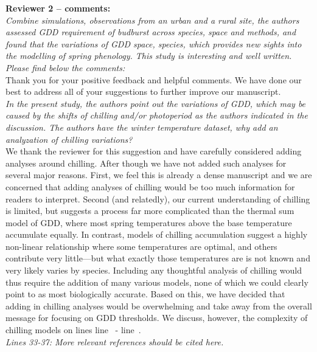 \documentclass[11pt,a4paper]{article}\usepackage[]{graphicx}\usepackage[]{color}
\newcommand{\lr}[1]{line~\lineref{#1}}
\begin{document}
\textbf {Reviewer 2 -- comments:} \\

\textit{Combine simulations, observations from an urban and a rural site, the authors assessed GDD requirement of budburst across species, space and methods, and found that the variations of GDD space, species, which provides new sights into the modelling of spring phenology. This study is interesting and well written. Please find below the comments:} \\

Thank you for your positive feedback and helpful comments. We have done our best to address all of your suggestions to further improve our manuscript. \\

\textit{In the present study, the authors point out the variations of GDD, which may be caused by the shifts of chilling and/or photoperiod as the authors indicated in the discussion. The authors have the winter temperature dataset, why add an analyzation of chilling variations?} \\

We thank the reviewer for this suggestion and have carefully considered adding analyses around chilling. After though we have not added such analyses for several major reasons. First, we feel this is already a dense manuscript and we are concerned that adding analyses of chilling would be too much information for readers to interpret. Second (and relatedly), our current understanding of chilling is limited, but suggests a process far more complicated than the thermal sum model of GDD, where most spring temperatures above the base temperature accumulate equally. In contrast, models of chilling accumulation suggest a highly non-linear relationship where some temperatures are optimal, and others contribute very little---but what exactly those temperatures are is not known and very likely varies by species. Including any thoughtful analysis of chilling would thus require the addition of many various models, none of which we could clearly point to as most biologically accurate. Based on this, we have decided that adding in chilling analyses would be overwhelming and take away from the overall message for focusing on GDD thresholds. We discuss, however, the complexity of chilling models on lines \lr{Z2chillstart} - \lr{Z2chillend}.  \\  

\textit{Lines 33-37: More relevant references should be cited here.} \\
\end{document}
